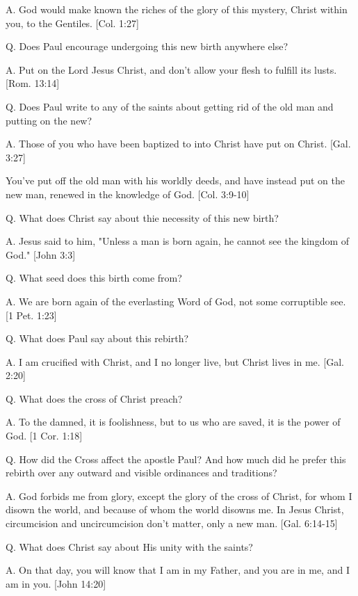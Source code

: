 \documentclass[../main.tex]{subfiles}
\begin{document}
	A. God would make known the riches of the glory of this mystery, Christ within you, to the Gentiles. [Col. 1:27]

	Q. Does Paul encourage undergoing this new birth anywhere else?

	A. Put on the Lord Jesus Christ, and don't allow your flesh to fulfill its lusts. [Rom. 13:14]

	Q. Does Paul write to any of the saints about getting rid of the old man and putting on the new?

	A. Those of you who have been baptized to into Christ have put on Christ. [Gal. 3:27]

	You've put off the old man with his worldly deeds, and have instead put on the new man, renewed in the knowledge of God. [Col. 3:9-10]

	Q. What does Christ say about thie necessity of this new birth?

	A. Jesus said to him, "Unless a man is born again, he cannot see the kingdom of God." [John 3:3]

	Q. What seed does this birth come from?

	A. We are born again of the everlasting Word of God, not some corruptible see. [1 Pet. 1:23]

	Q. What does Paul say about this rebirth?

	A. I am crucified with Christ, and I no longer live, but Christ lives in me. [Gal. 2:20]

	Q. What does the cross of Christ preach?

	A. To the damned, it is foolishness, but to us who are saved, it is the power of God. [1 Cor. 1:18]

	Q. How did the Cross affect the apostle Paul? And how much did he prefer this rebirth over any outward and visible ordinances and traditions?

	A. God forbids me from glory, except the glory of the cross of Christ, for whom I disown the world, and because of whom the world disowns me. In Jesus Christ, circumcision and uncircumcision don't matter, only a new man. [Gal. 6:14-15]

	Q. What does Christ say about His unity with the saints?

	A. On that day, you will know that I am in my Father, and you are in me, and I am in you. [John 14:20]
\end{document}
